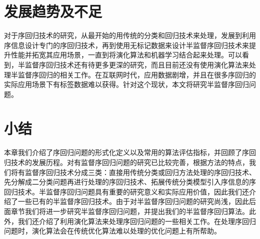 \section{发展趋势及不足}
对于序回归技术的研究，从最开始的用传统的分类和回归技术来处理，发展到利用序信息设计专门的序回归技术，再到使用无标记数据来设计半监督序回归技术来提升性能并拓宽其应用场景，一直到将演化算法和机器学习结合起来处理。可以看到，半监督序回归技术还有待更多更深的研究，而且目前还没有使用演化算法来处理半监督序回归的相关工作。在互联网时代，应用数据剧增，并且在很多序回归的实际应用场景下有标签数据难以获得。针对这个现状，本文将研究半监督序回归问题。

\section{小结}
本章我们介绍了序回归问题的形式化定义以及常用的算法评估指标，并回顾了序回归技术的发展历程。对有监督序回归问题的研究已比较完善，根据方法的特点，我们将有监督序回归技术分成三类：直接用传统分类或回归方法处理的序回归技术、先分解成二分类问题再进行处理的序回归技术、拓展传统分类模型引入序信息的序回归技术。半监督序回归问题具有重要的研究意义和实际应用价值，因此我们还介绍了一些已有的半监督序回归技术。由于对半监督序回归问题的研究尚浅，因此后面章节我们将进一步研究半监督序回归问题，并提出我们的半监督序回归算法。此外，我们还介绍了利用演化算法来处理序回归问题的一些相关工作。在处理序回归问题时，演化算法会在传统优化算法难以处理的优化问题上有所帮助。



